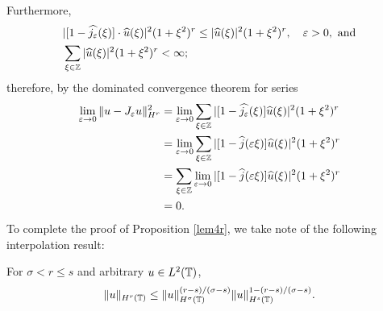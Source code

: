 Furthermore,
\begin{equation*}
	\begin{split}
		& |[1- \widehat{j_\ee}(\xi)] \cdot \widehat{u}(\xi)|^2 (1 + \xi^2)^r \le
		|\widehat{u}(\xi)|^2 (1 + \xi^2)^r, \quad \ee > 0, \ \text{and}
		\\
		& \sum_{\xi \in \zz} |\widehat{u}(\xi)|^2 (1 + \xi^2)^r < \infty;
	\end{split}
\end{equation*}
therefore, by the dominated convergence theorem for series
\begin{equation}
	\label{o1}
	\begin{split}
		\lim_{\varepsilon \to 0} \|u - J_\varepsilon u \|_{H^r }^2 
		& = \lim_{\varepsilon \to 0} \sum_{\xi \in \mathbb{Z}} |[1-\widehat{j_\varepsilon}(\xi)]
		\widehat{u}(\xi) |^2 (1 + \xi^2)^r
		\\
		& = \lim_{\varepsilon \to 0} \sum_{\xi \in \mathbb{Z}} |[1-\widehat{j}(\varepsilon \xi)]
		\widehat{u}(\xi) |^2 (1 + \xi^2)^r
		\\
		& = \sum_{\xi \in \mathbb{Z}} \lim_{\varepsilon \to 0} |[1-\widehat{j}(\varepsilon \xi)]
		\widehat{u}(\xi) |^2 (1 + \xi^2)^r
		\\
		& = 0.
	\end{split}
\end{equation}
To complete the proof of Proposition \ref{lem4r}, we take note of the following interpolation result:
\begin{remark}
	\label{lem2r}
	For $\sigma < r \le s$ and arbitrary $u \in L^2(\mathbb{T})$,
	\begin{equation}
		\begin{split}
			\|u\|_{H^{r}(\mathbb{T})} \le
			\|u\|_{H^\sigma(\mathbb{T})}^{(r-s)/(\sigma -s)}
			\|u\|_{H^s(\mathbb{T})}^{1 - (r-s)/(\sigma -s)}.
			\label{16u}
		\end{split}
	\end{equation}
\end{remark}
%
%
%
%
